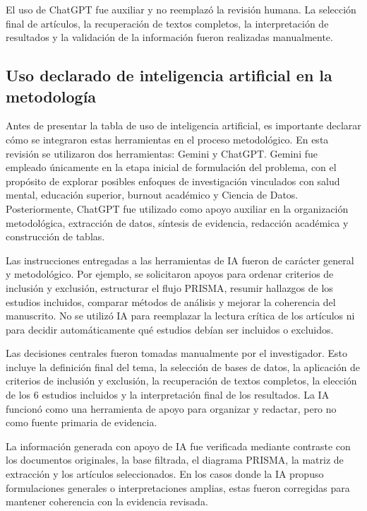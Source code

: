 \documentclass[12pt,a4paper]{article}
\begin{document}
El uso de ChatGPT fue auxiliar y no reemplazó la revisión humana. La selección final de artículos, la recuperación de textos completos, la interpretación de resultados y la validación de la información fueron realizadas manualmente.

\subsection{Uso declarado de inteligencia artificial en la metodología}

Antes de presentar la tabla de uso de inteligencia artificial, es importante declarar cómo se integraron estas herramientas en el proceso metodológico. En esta revisión se utilizaron dos herramientas: Gemini y ChatGPT. Gemini fue empleado únicamente en la etapa inicial de formulación del problema, con el propósito de explorar posibles enfoques de investigación vinculados con salud mental, educación superior, burnout académico y Ciencia de Datos. Posteriormente, ChatGPT fue utilizado como apoyo auxiliar en la organización metodológica, extracción de datos, síntesis de evidencia, redacción académica y construcción de tablas.

Las instrucciones entregadas a las herramientas de IA fueron de carácter general y metodológico. Por ejemplo, se solicitaron apoyos para ordenar criterios de inclusión y exclusión, estructurar el flujo PRISMA, resumir hallazgos de los estudios incluidos, comparar métodos de análisis y mejorar la coherencia del manuscrito. No se utilizó IA para reemplazar la lectura crítica de los artículos ni para decidir automáticamente qué estudios debían ser incluidos o excluidos.

Las decisiones centrales fueron tomadas manualmente por el investigador. Esto incluye la definición final del tema, la selección de bases de datos, la aplicación de criterios de inclusión y exclusión, la recuperación de textos completos, la elección de los 6 estudios incluidos y la interpretación final de los resultados. La IA funcionó como una herramienta de apoyo para organizar y redactar, pero no como fuente primaria de evidencia.

La información generada con apoyo de IA fue verificada mediante contraste con los documentos originales, la base filtrada, el diagrama PRISMA, la matriz de extracción y los artículos seleccionados. En los casos donde la IA propuso formulaciones generales o interpretaciones amplias, estas fueron corregidas para mantener coherencia con la evidencia revisada.
\end{document}

